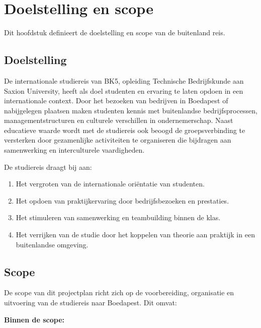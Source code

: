\section{Doelstelling en scope}

Dit hoofdstuk definieert de doelstelling en scope van de buitenland reis.

\subsection{Doelstelling}

De internationale studiereis van BK5, opleiding Technische Bedrijfskunde aan Saxion University, heeft als doel studenten en ervaring te laten opdoen in een internationale context. Door het bezoeken van bedrijven in Boedapest of nabijgelegen plaatsen maken studenten kennis met buitenlandse bedrijfsprocessen, managementstructuren en culturele verschillen in ondernemerschap. Naast educatieve waarde wordt met de studiereis ook beoogd de groepsverbinding te versterken door gezamenlijke activiteiten te organiseren die bijdragen aan samenwerking en interculturele vaardigheden.

\vspace{0.5cm}

De studiereis draagt bij aan:

\begin{enumerate}
	\item Het vergroten van de internationale oriëntatie van studenten.
	\item Het opdoen van praktijkervaring door bedrijfsbezoeken en prestaties.
	\item Het stimuleren van samenwerking en teambuilding binnen de klas.
	\item Het verrijken van de studie door het koppelen van theorie aan praktijk in een buitenlandse omgeving.
\end{enumerate}

\subsection{Scope}

De scope van dit projectplan richt zich op de voorbereiding, organisatie en uitvoering van de studiereis naar Boedapest. Dit omvat:

\textbf{Binnen de scope:}

